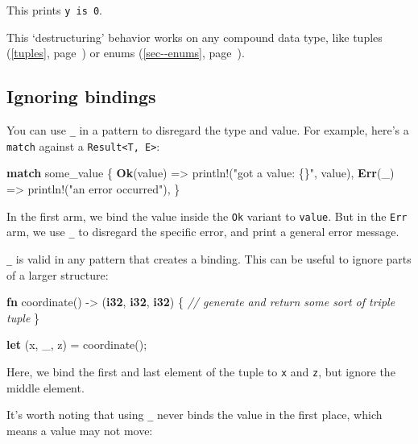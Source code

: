 \documentclass[a4paper,]{book}
\renewcommand*{\hyperref}[2][\ar]{%
  \def\ar{#2}%
  #2 (\autoref{#1}, page~\pageref{#1})}
\newenvironment{Shaded}{\begin{snugshade}}{\end{snugshade}}
\newcommand{\KeywordTok}[1]{\textcolor[rgb]{0.13,0.29,0.53}{\textbf{{#1}}}}
\newcommand{\StringTok}[1]{\textcolor[rgb]{0.31,0.60,0.02}{{#1}}}
\newcommand{\CommentTok}[1]{\textcolor[rgb]{0.56,0.35,0.01}{\textit{{#1}}}}
\newcommand{\OtherTok}[1]{\textcolor[rgb]{0.56,0.35,0.01}{{#1}}}
\newcommand{\NormalTok}[1]{{#1}}
\begin{document}
This prints \texttt{y\ is\ 0}.

This `destructuring' behavior works on any compound data type, like
\hyperref[tuples]{tuples} or \hyperref[sec--enums]{enums}.

\subsection{Ignoring bindings}\label{ignoring-bindings}

You can use \texttt{\_} in a pattern to disregard the type and value.
For example, here's a \texttt{match} against a
\texttt{Result\textless{}T,\ E\textgreater{}}:

\begin{Shaded}
\begin{Highlighting}[]
\KeywordTok{match} \NormalTok{some_value \{}
    \KeywordTok{Ok}\NormalTok{(value) => }\OtherTok{println!}\NormalTok{(}\StringTok{"got a value: \{\}"}\NormalTok{, value),}
    \KeywordTok{Err}\NormalTok{(_) => }\OtherTok{println!}\NormalTok{(}\StringTok{"an error occurred"}\NormalTok{),}
\NormalTok{\}}
\end{Highlighting}
\end{Shaded}

In the first arm, we bind the value inside the \texttt{Ok} variant to
\texttt{value}. But in the \texttt{Err} arm, we use \texttt{\_} to
disregard the specific error, and print a general error message.

\texttt{\_} is valid in any pattern that creates a binding. This can be
useful to ignore parts of a larger structure:

\begin{Shaded}
\begin{Highlighting}[]
\KeywordTok{fn} \NormalTok{coordinate() -> (}\KeywordTok{i32}\NormalTok{, }\KeywordTok{i32}\NormalTok{, }\KeywordTok{i32}\NormalTok{) \{}
    \CommentTok{// generate and return some sort of triple tuple}
\NormalTok{\}}

\KeywordTok{let} \NormalTok{(x, _, z) = coordinate();}
\end{Highlighting}
\end{Shaded}

Here, we bind the first and last element of the tuple to \texttt{x} and
\texttt{z}, but ignore the middle element.

It's worth noting that using \texttt{\_} never binds the value in the
first place, which means a value may not move:
\end{document}

